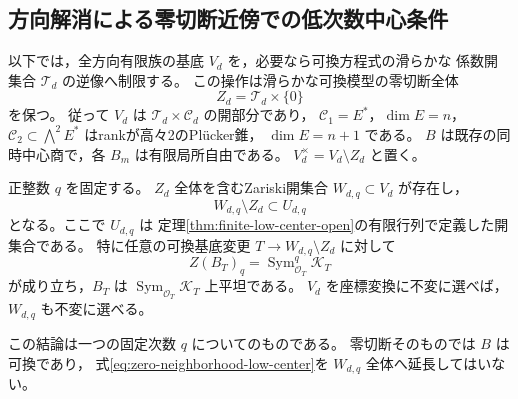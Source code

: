 \subsection{方向解消による零切断近傍での低次数中心条件}

以下では，全方向有限族の基底 $V_d$ を，必要なら可換方程式の滑らかな
係数開集合 $\mathcal T_d$ の逆像へ制限する。
この操作は滑らかな可換模型の零切断全体
\[
 Z_d=\mathcal T_d\times\{0\}
\]
を保つ。
従って $V_d$ は $\mathcal T_d\times\mathcal C_d$ の開部分であり，
$\mathcal C_1=E^*$，$\dim E=n$，
$\mathcal C_2\subset\bigwedge^2E^*$ はrankが高々2のPl\"ucker錐，
$\dim E=n+1$ である。
$B$ は既存の同時中心商で，各 $B_m$ は有限局所自由である。
$V_d^\times=V_d\setminus Z_d$ と置く。

\begin{theorem}[零切断全体を保つ低次数中心の一様化]
\label{thm:low-center-zero-neighborhood}
正整数 $q$ を固定する。
$Z_d$ 全体を含むZariski開集合 $W_{d,q}\subset V_d$ が存在し，
\[
 W_{d,q}\setminus Z_d\subset U_{d,q}
\]
となる。ここで $U_{d,q}$ は
定理\ref{thm:finite-low-center-open}の有限行列で定義した開集合である。
特に任意の可換基底変更 $T\to W_{d,q}\setminus Z_d$ に対して
\begin{equation}\label{eq:zero-neighborhood-low-center}
 Z(B_T)_q=\operatorname{Sym}^q_{\mathcal O_T}\mathcal K_T
\end{equation}
が成り立ち，$B_T$ は
$\operatorname{Sym}_{\mathcal O_T}\mathcal K_T$ 上平坦である。
$V_d$ を座標変換に不変に選べば，$W_{d,q}$ も不変に選べる。

この結論は一つの固定次数 $q$ についてのものである。
零切断そのものでは $B$ は可換であり，
式\eqref{eq:zero-neighborhood-low-center}を $W_{d,q}$ 全体へ延長してはいない。
\end{theorem}
